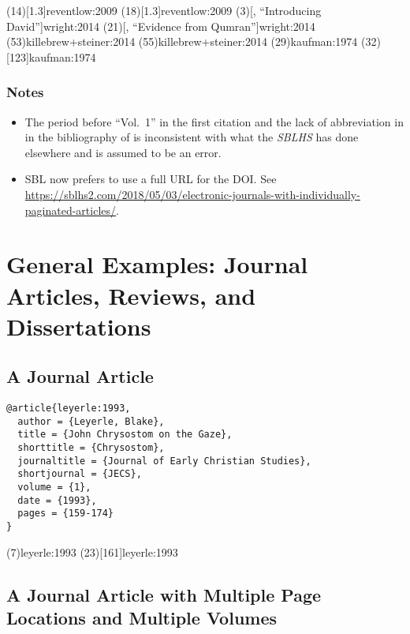 \documentclass[a4paper]{article}
\begin{document}
\examplecite(14)[1.3]{reventlow:2009}
\examplecite(18)[1.3]{reventlow:2009}
\examplecite(3)[, \mkbibquote{Introducing David}]{wright:2014}
\examplecite(21)[, \mkbibquote{Evidence from Qumran}]{wright:2014}
\examplecite(53){killebrew+steiner:2014}
\examplecite(55){killebrew+steiner:2014}
\examplecite(29){kaufman:1974}
\examplecite(32)[123]{kaufman:1974}
\exampleabbreviations
\examplebibliography

\subsubsection{Notes}

\begin{itemize}
  \item The period before ``Vol.~1'' in the first citation and the lack of
    abbreviation in in the bibliography of  is
    inconsistent with what the \emph{SBLHS} has done elsewhere and is assumed
    to be an error.
  \item SBL now prefers to use a full URL for the DOI. See
    \url{https://sblhs2.com/2018/05/03/electronic-journals-with-individually-paginated-articles/}.
\end{itemize}

\section{General Examples: Journal Articles, Reviews, and Dissertations}

\subsection{A Journal Article}

\begin{verbatim}
@article{leyerle:1993,
  author = {Leyerle, Blake},
  title = {John Chrysostom on the Gaze},
  shorttitle = {Chrysostom},
  journaltitle = {Journal of Early Christian Studies},
  shortjournal = {JECS},
  volume = {1},
  date = {1993},
  pages = {159-174}
}
\end{verbatim}

\examplecite(7){leyerle:1993}
\examplecite(23)[161]{leyerle:1993}
\exampleabbreviations
\examplebibliography

\subsection{A Journal Article with Multiple Page Locations and Multiple Volumes}
\end{document}
